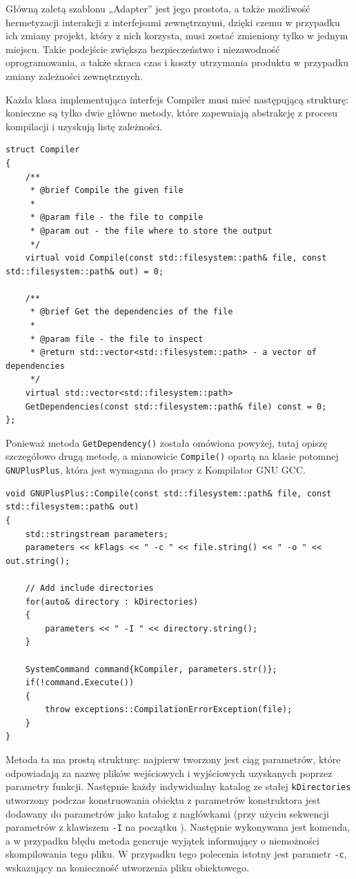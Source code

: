 Główną zaletą szablonu „Adapter” jest jego prostota, a także możliwość hermetyzacji interakcji z interfejsami zewnętrznymi, dzięki czemu w przypadku ich zmiany projekt, który z nich korzysta, musi zostać zmieniony tylko w jednym miejscu. Takie podejście zwiększa bezpieczeństwo i niezawodność oprogramowania, a także skraca czas i koszty utrzymania produktu w przypadku zmiany zależności zewnętrznych.

Każda klasa implementująca interfejs Compiler musi mieć następującą strukturę: konieczne są tylko dwie główne metody, które zapewniają abstrakcję z procesu kompilacji i uzyskują listę zależności.

\begin{lstlisting}[label=list:compiler,caption=Struktura interfejsu Compiler,basicstyle=\footnotesize\ttfamily]
struct Compiler
{
	/**
	 * @brief Compile the given file
	 * 
	 * @param file - the file to compile
	 * @param out - the file where to store the output
	 */
	virtual void Compile(const std::filesystem::path& file, const std::filesystem::path& out) = 0;

	/**
	 * @brief Get the dependencies of the file
	 * 
	 * @param file - the file to inspect
	 * @return std::vector<std::filesystem::path> - a vector of dependencies
	 */
	virtual std::vector<std::filesystem::path>
	GetDependencies(const std::filesystem::path& file) const = 0;
};
\end{lstlisting}

Ponieważ metoda \texttt{GetDependency()} została omówiona powyżej, tutaj opiszę szczegółowo drugą metodę, a mianowicie \texttt{Compile()} opartą na klasie potomnej \texttt{GNUPlusPlus}, która jest wymagana do pracy z Kompilator GNU GCC.

\begin{lstlisting}[label=list:gnu_compiler,caption=Implementacja metody GNUPlusPlus::Compile(),basicstyle=\footnotesize\ttfamily]
void GNUPlusPlus::Compile(const std::filesystem::path& file, const std::filesystem::path& out)
{
	std::stringstream parameters;
	parameters << kFlags << " -c " << file.string() << " -o " << out.string();

	// Add include directories
	for(auto& directory : kDirectories)
	{
		parameters << " -I " << directory.string();
	}

	SystemCommand command{kCompiler, parameters.str()};
	if(!command.Execute())
	{
		throw exceptions::CompilationErrorException(file);
	}
}
\end{lstlisting}

Metoda ta ma prostą strukturę: najpierw tworzony jest ciąg parametrów, które odpowiadają za nazwę plików wejściowych i wyjściowych uzyskanych poprzez parametry funkcji. Następnie każdy indywidualny katalog ze stałej \texttt{kDirectories} utworzony podczas konstruowania obiektu z parametrów konstruktora jest dodawany do parametrów jako katalog z nagłówkami (przy użyciu sekwencji parametrów z klawiszem \texttt{-I} na początku \cite{gcc}). Następnie wykonywana jest komenda, a w przypadku błędu metoda generuje wyjątek informujący o niemożności skompilowania tego pliku. W przypadku tego polecenia istotny jest parametr \texttt{-c}, wskazujący na konieczność utworzenia pliku obiektowego.

